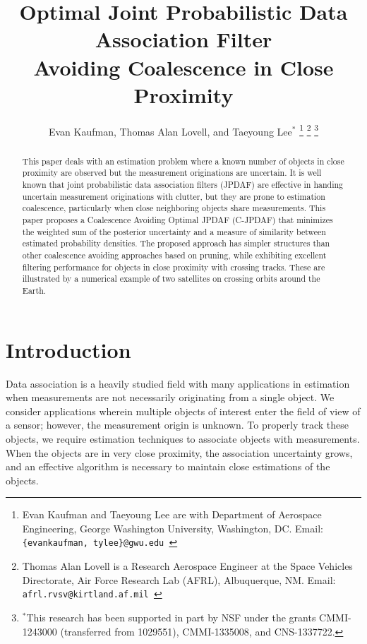 \documentclass[letterpaper, 10pt, conference]{ieeeconf}
\title{\LARGE \bf
Optimal Joint Probabilistic Data Association Filter\\ Avoiding Coalescence in Close Proximity }
\author{Evan Kaufman, Thomas Alan Lovell, and Taeyoung Lee$^*$
 \thanks{Evan Kaufman and Taeyoung Lee are with Department of Aerospace Engineering, George Washington University, Washington, DC. Email: {\tt\footnotesize \{evankaufman, tylee\}@gwu.edu }}
\thanks{Thomas Alan Lovell is a Research Aerospace Engineer at the Space Vehicles Directorate, Air Force Research Lab (AFRL), Albuquerque, NM. Email: {\tt\footnotesize afrl.rvsv@kirtland.af.mil }}
\thanks{$^*$This research has been supported in part by NSF under the grants CMMI-1243000 (transferred from 1029551), CMMI-1335008, and CNS-1337722.}}
\begin{document}
\allowdisplaybreaks


\maketitle \thispagestyle{empty} \pagestyle{empty}

\begin{abstract}
This paper deals with an estimation problem where a known number of objects in close proximity are observed but the measurement originations are uncertain. It is well known that joint probabilistic data association filters (JPDAF) are effective in handing uncertain measurement originations with clutter, but they are prone to estimation coalescence, particularly when close neighboring objects share measurements. This paper proposes a Coalescence Avoiding Optimal JPDAF (C-JPDAF) that minimizes the weighted sum of the posterior uncertainty and a measure of similarity between estimated probability densities. The proposed approach has simpler structures than other coalescence avoiding approaches based on pruning, while exhibiting excellent filtering performance for objects in close proximity with crossing tracks. These are illustrated by a numerical example of two satellites on crossing orbits around the Earth.
\end{abstract}


\section{Introduction}

Data association is a heavily studied field with many applications in estimation when measurements are not necessarily originating from a single object.
We consider applications wherein multiple objects of interest enter the field of view of a sensor; however, the measurement origin is unknown.
To properly track these objects, we require estimation techniques to associate objects with measurements.
When the objects are in very close proximity, the association uncertainty grows, and an effective algorithm is necessary to maintain close estimations of the objects.
\end{document}
